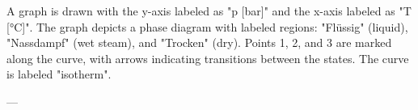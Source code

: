 A graph is drawn with the y-axis labeled as "p [bar]" and the x-axis labeled as "T [°C]". The graph depicts a phase diagram with labeled regions: "Flüssig" (liquid), "Nassdampf" (wet steam), and "Trocken" (dry). Points 1, 2, and 3 are marked along the curve, with arrows indicating transitions between the states. The curve is labeled "isotherm".

---